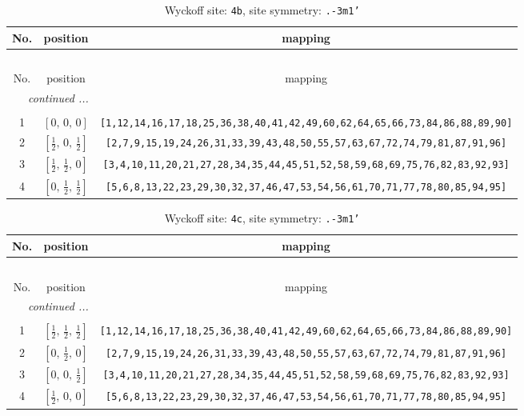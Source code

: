 \documentclass[fleqn,8pt]{jsarticle}
\begin{document}
\begin{longtable}{ccc}
\caption{Wyckoff site: {\tt 4b}, site symmetry: {\tt .-3m1'}}
 \\
 \hline \hline
No. & position & mapping \\ \hline \endfirsthead

\multicolumn{2}{l}{\tablename\ \thetable{}} \\
 \hline \hline
No. & position & mapping \\ \hline \endhead

 \hline \hline
\multicolumn{2}{r}{\footnotesize\it continued ...} \\ \endfoot

 \hline \hline
\multicolumn{2}{r}{} \\ \endlastfoot

1 & $\left[ 0,\, 0,\, 0 \right]$ & {\tt [1,12,14,16,17,18,25,36,38,40,41,42,49,60,62,64,65,66,73,84,86,88,89,90]} \\ \hline
2 & $\left[ \frac{1}{2},\, 0,\, \frac{1}{2} \right]$ & {\tt [2,7,9,15,19,24,26,31,33,39,43,48,50,55,57,63,67,72,74,79,81,87,91,96]} \\ \hline
3 & $\left[ \frac{1}{2},\, \frac{1}{2},\, 0 \right]$ & {\tt [3,4,10,11,20,21,27,28,34,35,44,45,51,52,58,59,68,69,75,76,82,83,92,93]} \\ \hline
4 & $\left[ 0,\, \frac{1}{2},\, \frac{1}{2} \right]$ & {\tt [5,6,8,13,22,23,29,30,32,37,46,47,53,54,56,61,70,71,77,78,80,85,94,95]} \\
\end{longtable}
\renewcommand{\arraystretch}{1.2}
\begin{longtable}{ccc}
\caption{Wyckoff site: {\tt 4c}, site symmetry: {\tt .-3m1'}}
 \\
 \hline \hline
No. & position & mapping \\ \hline \endfirsthead

\multicolumn{2}{l}{\tablename\ \thetable{}} \\
 \hline \hline
No. & position & mapping \\ \hline \endhead

 \hline \hline
\multicolumn{2}{r}{\footnotesize\it continued ...} \\ \endfoot

 \hline \hline
\multicolumn{2}{r}{} \\ \endlastfoot

1 & $\left[ \frac{1}{2},\, \frac{1}{2},\, \frac{1}{2} \right]$ & {\tt [1,12,14,16,17,18,25,36,38,40,41,42,49,60,62,64,65,66,73,84,86,88,89,90]} \\ \hline
2 & $\left[ 0,\, \frac{1}{2},\, 0 \right]$ & {\tt [2,7,9,15,19,24,26,31,33,39,43,48,50,55,57,63,67,72,74,79,81,87,91,96]} \\ \hline
3 & $\left[ 0,\, 0,\, \frac{1}{2} \right]$ & {\tt [3,4,10,11,20,21,27,28,34,35,44,45,51,52,58,59,68,69,75,76,82,83,92,93]} \\ \hline
4 & $\left[ \frac{1}{2},\, 0,\, 0 \right]$ & {\tt [5,6,8,13,22,23,29,30,32,37,46,47,53,54,56,61,70,71,77,78,80,85,94,95]} \\
\end{longtable}
\end{document}
